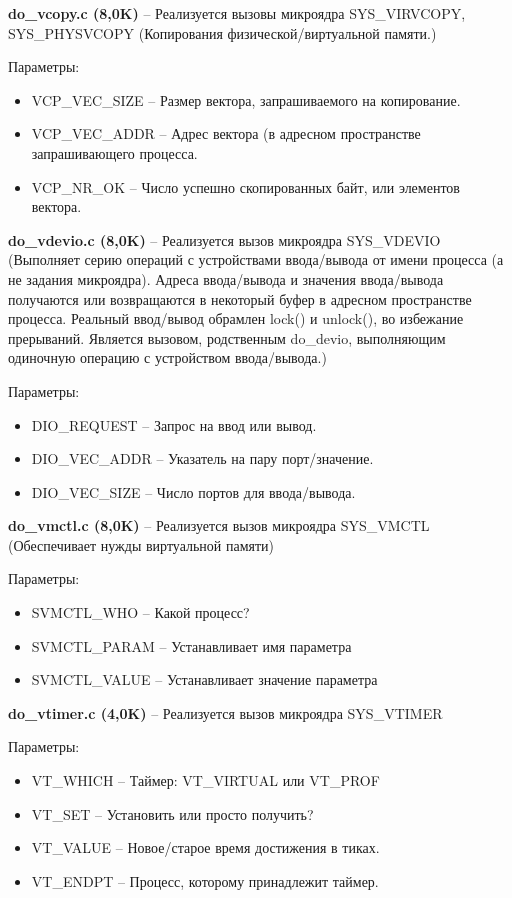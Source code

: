 \textbf{do\_vcopy.c (8,0K)} -- Реализуется вызовы микроядра SYS\_VIRVCOPY, SYS\_PHYSVCOPY (Копирования физической/виртуальной памяти.) 

Параметры:
\begin{itemize}
\item VCP\_VEC\_SIZE -- Размер вектора, запрашиваемого на копирование.
\item VCP\_VEC\_ADDR -- Адрес вектора (в адресном пространстве запрашивающего процесса.
\item VCP\_NR\_OK -- Число успешно скопированных байт, или элементов вектора.
\end{itemize}

\textbf{do\_vdevio.c (8,0K)} -- Реализуется вызов микроядра SYS\_VDEVIO (Выполняет серию операций с устройствами ввода/вывода от имени процесса (а не задания микроядра). Адреса ввода/вывода и значения ввода/вывода получаются или возвращаются в некоторый буфер в адресном пространстве процесса. Реальный ввод/вывод обрамлен lock() и unlock(), во избежание прерываний. Является вызовом, родственным do\_devio, выполняющим одиночную операцию с устройством ввода/вывода.)

Параметры:
\begin{itemize}
\item DIO\_REQUEST -- Запрос на ввод или вывод.
\item DIO\_VEC\_ADDR -- Указатель на пару порт/значение.
\item DIO\_VEC\_SIZE -- Число портов для ввода/вывода.
\end{itemize}

\textbf{do\_vmctl.c (8,0K)} -- Реализуется вызов микроядра SYS\_VMCTL (Обеспечивает нужды виртуальной памяти)

Параметры:
\begin{itemize}
\item SVMCTL\_WHO -- Какой процесс?
\item SVMCTL\_PARAM -- Устанавливает имя параметра
\item SVMCTL\_VALUE -- Устанавливает значение параметра
\end{itemize}

\textbf{do\_vtimer.c (4,0K)} -- Реализуется вызов микроядра SYS\_VTIMER

Параметры:
\begin{itemize}
\item VT\_WHICH -- Таймер: VT\_VIRTUAL или VT\_PROF
\item VT\_SET -- Установить или просто получить?
\item VT\_VALUE -- Новое/старое время достижения в тиках.
\item VT\_ENDPT -- Процесс, которому принадлежит таймер.
\end{itemize}

